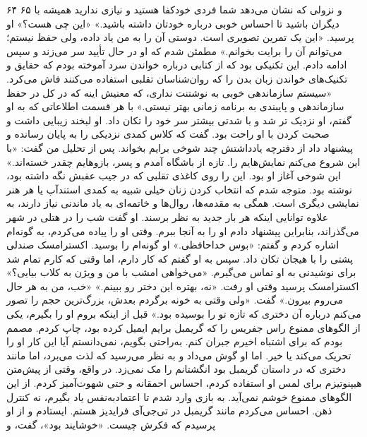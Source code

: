 ۶۴ ۶۵  
و نزولی که نشان می‌دهد شما فردی خودکفا هستید و نیازی ندارید همیشه با دیگران باشید تا احساس خوبی درباره خودتان داشته باشید.» «این چی هست؟» او پرسید.  
«این یک تمرین تصویری است. دوستی آن را به من یاد داده، ولی حفظ نیستم؛ می‌توانم آن را برایت بخوانم.»  
مطمئن شدم که او در حال تأیید سر می‌زند و سپس ادامه دادم. این تکنیکی بود که از کتابی درباره خواندن سرد آموخته بودم که حقایق و تکنیک‌های خواندن زبان بدن را که روان‌شناسان تقلبی استفاده می‌کنند فاش می‌کرد. «سیستم سازماندهی خوبی به نوشتنت نداری، که معنیش اینه که در کل در حفظ سازماندهی و پایبندی به برنامه زمانی بهتر نیستی.»  
با هر قسمت اطلاعاتی که به او گفتم، او نزدیک تر شد و با شدتی بیشتر سر خود را تکان داد. او لبخند زیبایی داشت و صحبت کردن با او راحت بود. گفت که کلاس کمدی نزدیکی را به پایان رسانده و پیشنهاد داد از دفترچه یادداشتش چند شوخی برایم بخواند.  
پس از تحلیل من گفت: «با این شروع می‌کنم نمایش‌هایم را. تازه از باشگاه آمدم و پسر، بازوهایم چقدر خسته‌اند.» این شوخی آغاز او بود. این را روی کاغذی تقلبی که در جیب عقبش نگه داشته بود، نوشته بود. متوجه شدم که انتخاب کردن زنان خیلی شبیه به کمدی استندآپ یا هر هنر نمایشی دیگری است. همگی به مقدمه‌ها، روال‌ها و خاتمه‌ای به یاد ماندنی نیاز دارند، به علاوه توانایی اینکه هر بار جدید به نظر برسند.  
او گفت شب را در هتلی در شهر می‌گذراند، بنابراین پیشنهاد دادم او را به آنجا ببرم. وقتی او را پیاده می‌کردم، به گونه‌ام اشاره کردم و گفتم: «بوس خداحافظی.» او گونه‌ام را بوسید. اکسترامسک صندلی پشتی را با هیجان تکان داد. سپس به او گفتم که کار دارم، اما وقتی که کارم تمام شد برای نوشیدنی به او تماس می‌گیرم.  
«می‌خواهی امشب با من و ویژن به کلاب بیایی؟» اکسترامسک پرسید وقتی او رفت. «نه، بهتره این دختر رو ببینم.»  
«خب، من به هر حال می‌روم بیرون.» گفت. «ولی وقتی به خونه برگردم بعدش، بزرگ‌ترین حجم را تصور می‌کنم درباره آن دختری که تازه تو را بوسیده بود.»  
قبل از اینکه بروم او را بگیرم، یکی از الگوهای ممنوع راس جفریس را که گریمبل برایم ایمیل کرده بود، چاپ کردم. مصمم بودم که برای اشتباه اخیرم جبران کنم. به‌راحتی بگویم، نمی‌دانستم آیا این کار او را تحریک می‌کند یا خیر. اما او گوش می‌داد و به نظر می‌رسید که لذت می‌برد، اما مانند دختری که در داستان گریمبل بود انگشتانم را مک نمی‌زد. در واقع، وقتی از پیش‌متن هیپنوتیزم برای لمس او استفاده کردم، احساس احمقانه و حتی شهوت‌آمیز کردم. از این الگوهای ممنوع خوشم نمی‌آید. به بازی وارد شدم تا اعتمادبه‌نفس یاد بگیرم، نه کنترل ذهن.  
احساس می‌کردم مانند گریمبل در تی‌جی‌آی فرایدیز هستم. ایستادم و از او پرسیدم که فکرش چیست. «خوشایند بود»، گفت، و